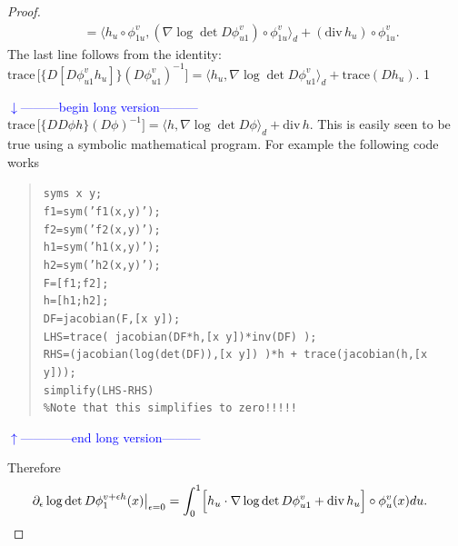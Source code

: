 \documentclass[noinfoline]{imsart}
\def\Ver{1}
\def\LongVer{1}
\begin{document}
\begin{proof}
\begin{align*}
 &=\bigl\langle  h_u\circ  \phi^v_{1u} ,(\nabla \log\det D\phi_{u1}^v )\circ  \phi^v_{1u} \bigr\rangle_d + (\text{div}\, h_u) \circ  \phi^v_{1u} .
\end{align*}
The last line follows from the identity: $\text{trace}\, \bigl[    \{D  [D\phi_{u1}^v h_u] \} (D\phi_{u1}^v)^{-1}\bigr]= \bigl\langle  h_u,\nabla \log\det D\phi_{u1}^v \bigr\rangle_d + \text{trace}(D h_u)$. 
\if\Ver\LongVer{ 
{\flushleft\textcolor{blue}{$\downarrow$---------begin long version---------}}\newline
$\text{trace}\, \bigl[    \{D  D\phi h \} (D\phi)^{-1}\bigr]= \bigl\langle  h,\nabla \log\det D\phi \bigr\rangle_d + \text{div}\, h$. This is easily seen to be true using a symbolic mathematical program. For example the following {} code works
\begin{quote}
\tt{syms x y;\\
f1=sym('f1(x,y)');\\
f2=sym('f2(x,y)'); \\
h1=sym('h1(x,y)'); \\
h2=sym('h2(x,y)'); \\
F=[f1;f2]; \\
h=[h1;h2]; \\
DF=jacobian(F,[x y]);\\
LHS=trace( jacobian(DF*h,[x y])*inv(DF) );\\
RHS=(jacobian(log(det(DF)),[x y])  )*h + trace(jacobian(h,[x y]));\\
simplify(LHS-RHS)\\
\%Note that this simplifies to zero!!!!!}
\end{quote}
{\flushleft\textcolor{blue}{$\uparrow$------------end long version---------}}\newline
} \fi
Therefore
 \begin{align*}
\partial_\epsilon  \log \det D\phi_{1}^{v+\epsilon h }(x)\bigr|_{\epsilon = 0} & = \int_0^1  \Bigl[ h_u \cdot \nabla \log\det D\phi_{u1}^v   + \text{div}\, h_u  \Bigr]\circ  \phi^v_{u}(x)  du.
\end{align*}
 
 
\end{proof}
\end{document}
